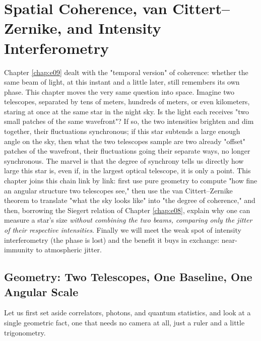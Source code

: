\chapter{Spatial Coherence, van Cittert--Zernike, and Intensity Interferometry}
\label{chap:e10}

\begin{chapteropening}
Chapter \ref{chap:e09} dealt with the "temporal version" of coherence: whether the same beam of light, at this instant and a little later, still remembers its own phase. This chapter moves the very same question into space. Imagine two telescopes, separated by tens of meters, hundreds of meters, or even kilometers, staring at once at the same star in the night sky. Is the light each receives "two small patches of the same wavefront"? If so, the two intensities brighten and dim together, their fluctuations synchronous; if this star subtends a large enough angle on the sky, then what the two telescopes sample are two already "offset" patches of the wavefront, their fluctuations going their separate ways, no longer synchronous. The marvel is that the degree of synchrony tells us directly how large this star is, even if, in the largest optical telescope, it is only a point. This chapter joins this chain link by link: first use pure geometry to compute "how fine an angular structure two telescopes see," then use the van Cittert--Zernike theorem to translate "what the sky looks like" into "the degree of coherence," and then, borrowing the Siegert relation of Chapter \ref{chap:e08}, explain why one can measure a star's size \emph{without combining the two beams, comparing only the jitter of their respective intensities}. Finally we will meet the weak spot of intensity interferometry (the phase is lost) and the benefit it buys in exchange: near-immunity to atmospheric jitter.
\end{chapteropening}

\section{Geometry: Two Telescopes, One Baseline, One Angular Scale}
\label{sec:e10-geometry}

Let us first set aside correlators, photons, and quantum statistics, and look at a single geometric fact, one that needs no camera at all, just a ruler and a little trigonometry.

